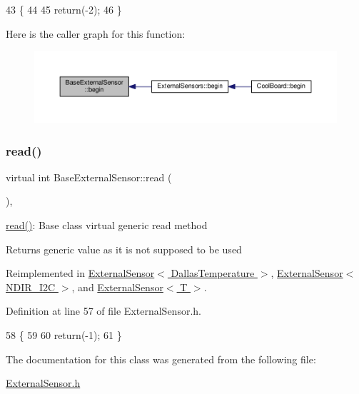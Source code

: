 \begin{DoxyCode}
43     \{
44 
45         \textcolor{keywordflow}{return}(-2);
46     \}
\end{DoxyCode}
Here is the caller graph for this function\+:\nopagebreak
\begin{figure}[H]
\begin{center}
\leavevmode
\includegraphics[width=350pt]{classBaseExternalSensor_a87d132803d4f4fdd4e66332809f0c9a0_icgraph}
\end{center}
\end{figure}
\mbox{\label{classBaseExternalSensor_a7e0a98f350148d7645031315657aa5ec}} 
\subsubsection{\texorpdfstring{read()}{read()}}
{\footnotesize\ttfamily virtual int Base\+External\+Sensor\+::read (\begin{DoxyParamCaption}{ }\end{DoxyParamCaption})\hspace{0.3cm}{\ttfamily [inline]}, {\ttfamily [virtual]}}

\hyperlink{classBaseExternalSensor_a7e0a98f350148d7645031315657aa5ec}{read()}\+: Base class virtual generic read method

\begin{DoxyReturn}{Returns}
generic value as it is not supposed to be used 
\end{DoxyReturn}


Reimplemented in \hyperlink{classExternalSensor_3_01DallasTemperature_01_4_a127ead06440ec972c22db2abeb8e2b51}{External\+Sensor$<$ Dallas\+Temperature $>$}, \hyperlink{classExternalSensor_3_01NDIR__I2C_01_4_add67f5ecaf47d2ee675e8299aee7322d}{External\+Sensor$<$ N\+D\+I\+R\+\_\+\+I2\+C $>$}, and \hyperlink{classExternalSensor_a6dbf2d6b1c183740ce0f153d6e43ccb2}{External\+Sensor$<$ T $>$}.



Definition at line 57 of file External\+Sensor.\+h.


\begin{DoxyCode}
58     \{
59 
60         \textcolor{keywordflow}{return}(-1);
61     \}
\end{DoxyCode}


The documentation for this class was generated from the following file\+:\begin{DoxyCompactItemize}
\item 
\hyperlink{ExternalSensor_8h}{External\+Sensor.\+h}\end{DoxyCompactItemize}
